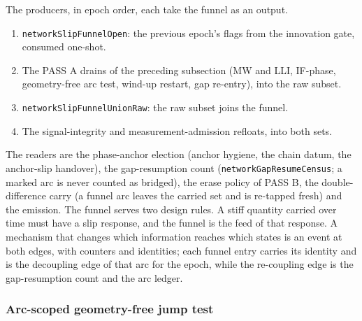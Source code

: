 \documentclass[main.tex]{subfiles}
\begin{document}
The producers, in epoch order, each take the funnel as an output.
\begin{enumerate}[leftmargin=*, itemsep=0pt]
\item \texttt{networkSlipFunnelOpen}: the previous epoch's flags from the
  innovation gate, consumed one-shot.
\item The PASS A drains of the preceding subsection (MW and LLI, IF-phase,
  geometry-free arc test, wind-up restart, gap re-entry), into the raw
  subset.
\item \texttt{networkSlipFunnelUnionRaw}: the raw subset joins the funnel.
\item The signal-integrity and measurement-admission refloats, into both
  sets.
\end{enumerate}
The readers are the phase-anchor election (anchor hygiene, the chain datum,
the anchor-slip handover), the gap-resumption count
(\texttt{networkGapResumeCensus}; a marked arc is never counted as
bridged), the erase policy of PASS B, the double-difference carry (a funnel
arc leaves the carried set and is re-tapped fresh) and the emission.  The
funnel serves two design rules.  A stiff
quantity carried over time must have a slip response, and the funnel is the
feed of that response.  A mechanism that changes which information reaches
which states is an event at both edges, with counters and identities; each
funnel entry carries its identity and is the decoupling edge of that arc
for the epoch, while the re-coupling edge is the gap-resumption count and
the arc ledger.

\subsubsection{Arc-scoped geometry-free jump test}\label{sec:slip-gfjump}
\end{document}
